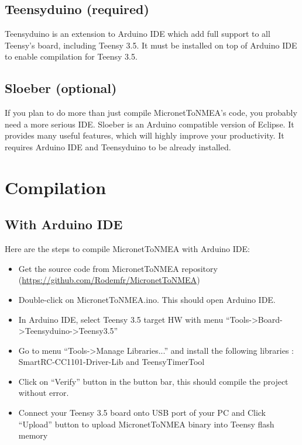 \documentclass{report}
\begin{document}
\section{Teensyduino (required)}

Teensyduino is an extension to Arduino IDE which add full support to all Teensy’s board, including Teensy 3.5. It must be installed on top of Arduino IDE to enable compilation for Teensy 3.5.

\section{Sloeber (optional)}

If you plan to do more than just compile MicronetToNMEA’s code, you probably need a more serious IDE. Sloeber is an Arduino compatible version of Eclipse. It provides many useful features, which will highly improve your productivity. It requires Arduino IDE and Teensyduino to be already installed.

\chapter{Compilation}

\section{With Arduino IDE}

Here are the steps to compile MicronetToNMEA with Arduino IDE:

\begin{itemize}
\item Get the source code from MicronetToNMEA repository (\url{https://github.com/Rodemfr/MicronetToNMEA})
\item Double-click on MicronetToNMEA.ino. This should open Arduino IDE.
\item In Arduino IDE, select Teensy 3.5 target HW with menu “Tools->Board->Teensyduino->Teensy3.5”
\item Go to menu “Tools->Manage Libraries...” and install the following libraries : SmartRC-CC1101-Driver-Lib and TeensyTimerTool
\item Click on “Verify” button in the button bar, this should compile the project without error.
\item Connect your Teensy 3.5 board onto USB port of your PC and Click “Upload” button to upload MicronetToNMEA binary into Teensy flash memory
\end{itemize}
\end{document}

